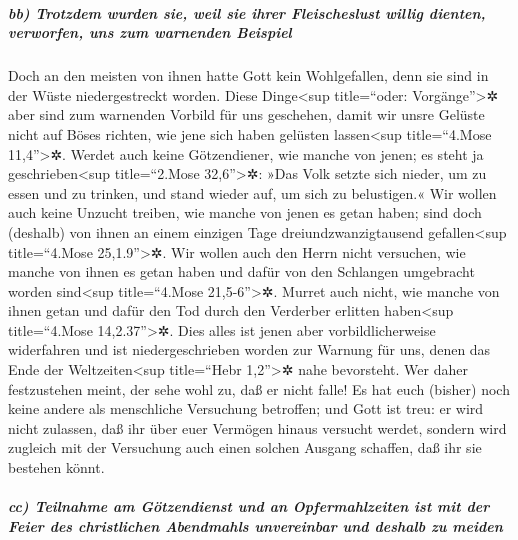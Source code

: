 \hypertarget{bb-trotzdem-wurden-sie-weil-sie-ihrer-fleischeslust-willig-dienten-verworfen-uns-zum-warnenden-beispiel}{%
\subparagraph{bb) Trotzdem wurden sie, weil sie ihrer Fleischeslust
willig dienten, verworfen, uns zum warnenden
Beispiel}\label{bb-trotzdem-wurden-sie-weil-sie-ihrer-fleischeslust-willig-dienten-verworfen-uns-zum-warnenden-beispiel}}

 Doch an den meisten von ihnen hatte Gott kein
Wohlgefallen, denn sie sind in der Wüste niedergestreckt worden.
 Diese Dinge\textless sup title=``oder:
Vorgänge''\textgreater✲ aber sind zum warnenden Vorbild für uns
geschehen, damit wir unsre Gelüste nicht auf Böses richten, wie jene
sich haben gelüsten lassen\textless sup title=``4.Mose
11,4''\textgreater✲.  Werdet auch keine Götzendiener, wie
manche von jenen; es steht ja geschrieben\textless sup title=``2.Mose
32,6''\textgreater✲: »Das Volk setzte sich nieder, um zu essen und zu
trinken, und stand wieder auf, um sich zu belustigen.« 
Wir wollen auch keine Unzucht treiben, wie manche von jenen es getan
haben; sind doch (deshalb) von ihnen an einem einzigen Tage
dreiundzwanzigtausend gefallen\textless sup title=``4.Mose
25,1.9''\textgreater✲.  Wir wollen auch den Herrn nicht
versuchen, wie manche von ihnen es getan haben und dafür von den
Schlangen umgebracht worden sind\textless sup title=``4.Mose
21,5-6''\textgreater✲.  Murret auch nicht, wie manche von
ihnen getan und dafür den Tod durch den Verderber erlitten
haben\textless sup title=``4.Mose 14,2.37''\textgreater✲.
 Dies alles ist jenen aber vorbildlicherweise widerfahren
und ist niedergeschrieben worden zur Warnung für uns, denen das Ende der
Weltzeiten\textless sup title=``Hebr 1,2''\textgreater✲ nahe bevorsteht.
 Wer daher festzustehen meint, der sehe wohl zu, daß er
nicht falle!  Es hat euch (bisher) noch keine andere als
menschliche Versuchung betroffen; und Gott ist treu: er wird nicht
zulassen, daß ihr über euer Vermögen hinaus versucht werdet, sondern
wird zugleich mit der Versuchung auch einen solchen Ausgang schaffen,
daß ihr sie bestehen könnt.

\hypertarget{cc-teilnahme-am-guxf6tzendienst-und-an-opfermahlzeiten-ist-mit-der-feier-des-christlichen-abendmahls-unvereinbar-und-deshalb-zu-meiden}{%
\subparagraph{cc) Teilnahme am Götzendienst und an Opfermahlzeiten ist
mit der Feier des christlichen Abendmahls unvereinbar und deshalb zu
meiden}\label{cc-teilnahme-am-guxf6tzendienst-und-an-opfermahlzeiten-ist-mit-der-feier-des-christlichen-abendmahls-unvereinbar-und-deshalb-zu-meiden}}

